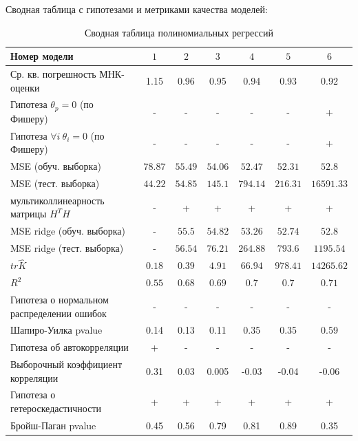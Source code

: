 \documentclass[a4paper,12pt]{article}
\begin{document}
Сводная таблица с гипотезами и метриками качества моделей:
\begin{table}[H]
    \begin{center}
            \begin{tabular}{|l|c|c|c|c|c|c|}
                \hline
                Номер модели & $1$ & $2$ & $3$ & $4$ & $5$ & $6$ \\ \hline
                Ср. кв. погрешность МНК-оценки & 1.15 & 0.96 & 0.95 & 0.94 & 0.93 & 0.92 \\ \hline
                Гипотеза $\theta_p = 0$ (по Фишеру) & - & - & - & - & - & + \\ \hline
                Гипотеза $\forall i~\theta_i = 0$ (по Фишеру) & - & - & - & - & - & + \\ \hline
                MSE (обуч. выборка) & $78.87$ & $55.49$ & $54.06$ & $52.47$ & $52.31$ & $52.8$ \\ \hline
                MSE (тест. выборка) & $44.22$ & $54.85$ & $145.1$ & $794.14$ & $216.31$ & $16591.33$ \\ \hline
                мультиколлинеарность матрицы $H^T H$ & - & + & + & + & + & + \\ \hline
                MSE ridge (обуч. выборка) & - & $55.5$ & $54.82$ & $53.26$ & $52.74$ & $52.8$ \\ \hline
                MSE ridge (тест. выборка) & - & $56.54$ & $76.21$ & $264.88$ & $793.6$ & $1195.54$ \\ \hline
                $tr \hat K$ & $0.18$ & $0.39$ & $4.91$ & $66.94$ & $978.41$ & $14265.62$ \\ \hline
                $R^2$ & $0.55$ & $0.68$ & $0.69$ & $0.7$ & $0.7$ & $0.71$ \\ \hline
                Гипотеза о нормальном распределении ошибок & - & - & - & - & - & - \\ \hline
                Шапиро-Уилка pvalue  & 0.14 & 0.13 & 0.11 & 0.35 & 0.35 & 0.59 \\ \hline
                Гипотеза об автокорреляции & + & - & - & - & - & - \\ \hline
                Выборочный коэффициент корреляции & 0.31 & 0.03 & 0.005 & -0.03 & -0.04 & -0.06 \\ \hline
                Гипотеза о гетероскедастичности & + & + & + & + & + & + \\ \hline
                Бройш-Паган pvalue & 0.45 & 0.56 & 0.79 & 0.81 & 0.89 & 0.35 \\ \hline
            \end{tabular}
        \caption{Сводная таблица полиномиальных регрессий}
        \label{poly_table}
    \end{center}
\end{table}
\end{document}
